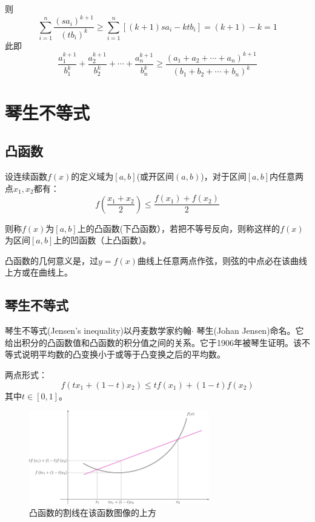\documentclass[a4paper]{article} %
\numberwithin{equation}{section} %
\begin{document}
则
\begin{equation}
\sum_{i=1}^n\frac{(sa_i)^{k+1}}{(tb_i)^k}\ge \sum_{i=1}^n\left[(k+1)sa_i-ktb_i\right ]=(k+1)-k=1
\end{equation}
此即
\begin{equation}
\frac{a_1^{k+1}}{b_1^k}+\frac{a_2^{k+1}}{b_2^k}+\cdots+\frac{a_n^{k+1}}{b_n^k}\ge \frac{(a_1+a_2+\cdots+a_n)^{k+1}}{(b_1+b_2+\cdots+b_n)^k}
\end{equation}


\section{琴生不等式}

\subsection{凸函数}
设连续函数$f(x)$的定义域为$[a,b]$(或开区间$(a,b)$)，对于区间$[a,b]$内任意两点$x_1,x_2$都有：
\begin{equation}
f(\frac{x_1+x_2}{2}) \le \frac{f(x_1)+f(x_2)}{2} 
\end{equation}

则称$f(x)$为$[a,b]$上的凸函数(下凸函数），若把不等号反向，则称这样的$f(x)$为区间$[a,b]$上的凹函数（上凸函数）。

凸函数的几何意义是，过$y=f(x)$曲线上任意两点作弦，则弦的中点必在该曲线上方或在曲线上。

\subsection{琴生不等式}
琴生不等式(Jensen's inequality)以丹麦数学家约翰$\cdot$ 琴生(Johan Jensen)命名。它给出积分的凸函数值和凸函数的积分值之间的关系。它于1906年被琴生证明。该不等式说明平均数的凸变换小于或等于凸变换之后的平均数。


两点形式：
\begin{equation*}
f(tx_1+(1-t)x_2)\le tf(x_1)+(1-t)f(x_2) \label{eq:twopoint}
\end{equation*}
其中$t\in[0,1]$。

\begin{figure}[H]
\centering
\includegraphics[width=0.7\textwidth]{convex.png}
\caption{凸函数的割线在该函数图像的上方}
\end{figure}
\end{document}
